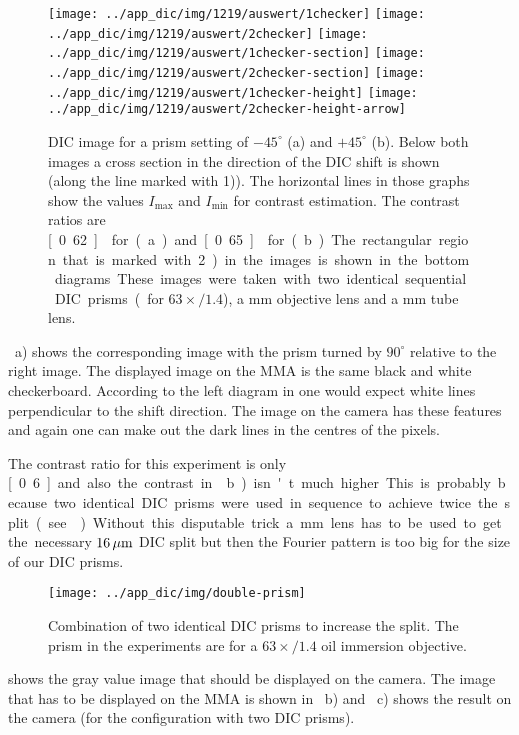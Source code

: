 \begin{figure}[p]
  \centering
  \texttt{[image: ../app\_dic/img/1219/auswert/1checker]}
  \texttt{[image: ../app\_dic/img/1219/auswert/2checker]}
  \texttt{[image: ../app\_dic/img/1219/auswert/1checker-section]}
  \texttt{[image: ../app\_dic/img/1219/auswert/2checker-section]}
  \texttt{[image: ../app\_dic/img/1219/auswert/1checker-height]}
  \texttt{[image: ../app\_dic/img/1219/auswert/2checker-height-arrow]}
  \caption{ DIC image for a prism setting of $-45^\circ$ (a) and
    $+45^\circ$ (b). Below both images a cross section in the
    direction of the DIC shift is shown (along the line marked with
    1)). The horizontal lines in those graphs show the values
    $I_\textrm{max}$ and $I_\textrm{min}$ for contrast estimation. The
    contrast ratios are \unit[0.62]{} for (a) and \unit[0.65]{} for
    (b). The rectangular region that is marked with 2) in the images
    is shown in the bottom diagrams. These images were taken with two
    identical sequential DIC prisms (for $63\times/1.4$), a
    \unit[100]{mm} objective lens and a \unit[300]{mm} tube lens.}
  \label{fig:screen5}
\end{figure}

~a) shows the corresponding image with
the prism turned by $90^\circ$ relative to the right image. The
displayed image on the MMA is the same black and white
checkerboard. According to the left diagram in  one
would expect white lines perpendicular to the shift direction. The
image on the camera has these features and again one can make out the
dark lines in the centres of the pixels.

The contrast ratio for this experiment is only \unit[0.6] and also the
contrast in ~b) isn't much higher. This is
probably because two identical DIC prisms were used in sequence to
achieve twice the split (see ). Without this
disputable trick a \unit[200]{mm} lens has to be used to get the
necessary $\unit[16]{\mu m}$ DIC split but then the Fourier pattern is
too big for the size of our DIC prisms. 
\begin{figure}[htb]
  \centering
  \texttt{[image: ../app\_dic/img/double-prism]}
  \caption{Combination of two identical DIC prisms to increase the
    split. The prism in the experiments are for a $63\times/1.4$ oil
    immersion objective.}
  \label{fig:double-prism}
\end{figure}
 shows the gray value image that should be
displayed on the camera. The image that has to be displayed on the MMA
is shown in ~b) and
~c) shows the result on the camera (for the
configuration with two DIC prisms).

